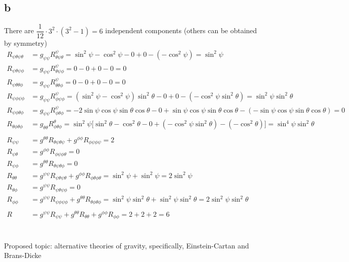 \documentclass{article}
\begin{document}
\subsection*{b}
There are $\dfrac{1}{12}\cdot3^2\cdot(3^2-1) = 6$ independent components (others can be obtained by symmetry) 
\begin{align*}
R_{\psi\theta\psi\theta} &= g_{\psi\psi}R^{\psi}_{\theta\psi\theta} = \sin^2\psi-\cos^2\psi - 0 + 0 - (-\cos^2\psi) = \sin^2\psi \\
R_{\psi\theta\psi\phi} &= g_{\psi\psi}R^{\psi}_{\theta\psi\phi} = 0 - 0 + 0 - 0 = 0 \\
R_{\psi\theta\theta\phi} &= g_{\psi\psi}R^{\psi}_{\theta\theta\phi} = 0 - 0 + 0 - 0 = 0 \\
R_{\psi\phi\psi\phi} &= g_{\psi\psi}R^{\psi}_{\phi\psi\phi} =  (\sin^2\psi-\cos^2\psi)\sin^2\theta - 0 + 0 - (-\cos^2\psi\sin^2\theta) = \sin^2\psi\sin^2\theta \\
R_{\psi\phi\theta\phi} &= g_{\psi\psi}R^{\psi}_{\phi\theta\phi} = -2\sin\psi\cos\psi\sin\theta\cos\theta - 0 + \sin\psi\cos\psi\sin\theta\cos\theta - (-\sin\psi\cos\psi\sin\theta\cos\theta) = 0 \\
R_{\theta\phi\theta\phi} &= g_{\theta\theta}R^{\theta}_{\phi\theta\phi} = \sin^2\psi\Big[\sin^2\theta -\cos^2\theta - 0 + (-\cos^2\psi\sin^2\theta) - (-\cos^2\theta)\Big] = \sin^4\psi\sin^2\theta \\\\
R_{\psi\psi} &= g^{\theta\theta}R_{\theta\psi\theta\psi} + g^{\phi\phi}R_{\phi\psi\phi\psi} = 2\\
R_{\psi\theta} &= g^{\phi\phi}R_{\phi\psi\phi\theta} = 0\\
R_{\psi\phi} &= g^{\theta\theta}R_{\theta\psi\theta\phi} = 0 \\
R_{\theta\theta} &= g^{\psi\psi}R_{\psi\theta\psi\theta} + g^{\phi\phi}R_{\phi\theta\phi\theta} = \sin^2\psi + \sin^2\psi = 2\sin^2\psi\\
R_{\theta\phi} &= g^{\psi\psi}R_{\psi\theta\psi\phi} = 0\\
R_{\phi\phi} &= g^{\psi\psi}R_{\psi\phi\psi\phi} + g^{\theta\theta}R_{\theta\phi\theta\phi} = \sin^2\psi\sin^2\theta + \sin^2\psi\sin^2\theta = 2\sin^2\psi\sin^2\theta\\\\
R &= g^{\psi\psi}R_{\psi\psi} + g^{\theta\theta}R_{\theta\theta} + g^{\phi\phi}R_{\phi\phi} = 2 + 2 + 2 = 6
\end{align*}
\section{}
Proposed topic: alternative theories of gravity, specifically, Einstein-Cartan and Brans-Dicke
\end{document}
